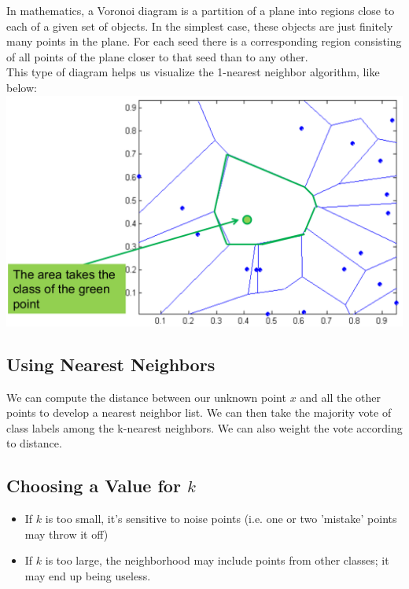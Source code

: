 \documentclass[english, 10pt]{article}
\begin{document}
\begin{tcolorbox}[title=Aside: Voronoi Diagram,colframe=black,colback=white,arc=0pt,fonttitle=\bfseries]

In mathematics, a Voronoi diagram is a partition of a plane into regions close to each of a given set of objects. In the simplest case, these objects are just finitely many points in the plane. For each seed there is a corresponding region consisting of all points of the plane closer to that seed than to any other.\\

This type of diagram helps us visualize the 1-nearest neighbor algorithm, like below:\\

\includegraphics[scale=0.375]{img/voronoi.png} 

\end{tcolorbox}

\subsection{Using Nearest Neighbors}

We can compute the distance between our unknown point $x$ and all the other points to develop a nearest neighbor list. We can then take the majority vote of class labels among the k-nearest neighbors. We can also weight the vote according to distance.

\subsection{Choosing a Value for $k$}
\begin{itemize}
	\item If $k$ is too small, it's sensitive to noise points (i.e. one or two 'mistake' points may throw it off)
	\item If $k$ is too large, the neighborhood may include points from other classes; it may end up being useless.
\end{itemize}
\end{document}
